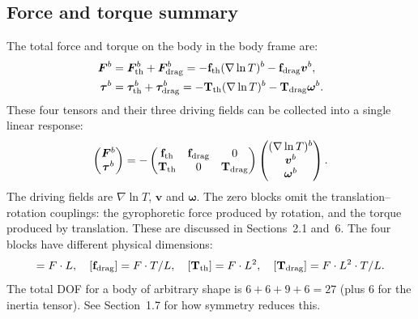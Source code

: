 \documentclass[11pt]{article}
\newcommand{\chg}[1]{\marginpar{\raggedright\footnotesize\textcolor{red!70!black}{\textsf{#1}}}}
\newcommand{\vect}[1]{\bm{#1}}
\begin{document}
\subsection{Force and torque summary}
The total force and torque on the body in the body frame are:
\begin{align}
  \vect F^b &= \vect F^b_{\rm th}+\vect F^b_{\rm drag} = -\mathbf f_{\rm th}(\nabla\ln T)^b-\mathbf f_{\rm drag}\vect v^b,\\
  \vect\tau^b &= \vect\tau^b_{\rm th}+\vect\tau^b_{\rm drag} = -\mathbf T_{\rm th}(\nabla\ln T)^b-\mathbf T_{\rm drag}\vect\omega^b.
\end{align}
These four tensors and their three driving fields can be collected into a single linear response:\chg{C3}
\begin{equation}
  \begin{pmatrix}\vect F^b\\ \vect\tau^b\end{pmatrix}
  = -\begin{pmatrix}\mathbf f_{\rm th} & \mathbf f_{\rm drag} & 0\\ \mathbf T_{\rm th} & 0 & \mathbf T_{\rm drag}\end{pmatrix}
  \begin{pmatrix}(\nabla\ln T)^b\\ \vect v^b\\ \vect\omega^b\end{pmatrix}.
\end{equation}
The driving fields are $\nabla\ln T$, $\vect v$ and $\vect\omega$. The zero blocks omit the translation--rotation couplings: the gyrophoretic force produced by rotation, and the torque produced by translation. These are discussed in Sections~2.1 and~6. The four blocks have different physical dimensions:
\begin{equation}
  [\mathbf f_{\rm th}] = F\cdot L,\quad [\mathbf f_{\rm drag}] = F\cdot T/L,\quad [\mathbf T_{\rm th}] = F\cdot L^2,\quad [\mathbf T_{\rm drag}] = F\cdot L^2\cdot T/L.
\end{equation}
The total DOF for a body of arbitrary shape is $6+6+9+6=27$ (plus 6 for the inertia tensor). See Section~1.7 for how symmetry reduces this.
\end{document}
